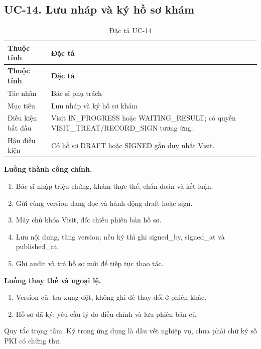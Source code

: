 \clearpage

\subsection{UC-14.\allowbreak{} Lưu nháp và ký hồ sơ khám}
\label{uc:14}

{\small\setlength{\tabcolsep}{3pt}\renewcommand{\arraystretch}{1.12}
\begin{longtable}{@{}L{\textwidth-1.32pt\relax} L{\textwidth-4.68pt\relax}@{}}
\caption{Đặc tả UC-14}\\
\toprule
\textbf{Thuộc tính} & \textbf{Đặc tả}\\\midrule
\endfirsthead
\toprule
\textbf{Thuộc tính} & \textbf{Đặc tả}\\\midrule
\endhead
\bottomrule\endlastfoot
Tác nhân & Bác sĩ phụ trách\\[3pt]
Mục tiêu & Lưu nháp và ký hồ sơ khám\\[3pt]
Điều kiện bắt đầu & Visit IN\_\allowbreak{}PROGRESS hoặc WAITING\_\allowbreak{}RESULT; có quyền VISIT\_\allowbreak{}TREAT/\allowbreak{}RECORD\_\allowbreak{}SIGN tương ứng.\allowbreak{}\\[3pt]
Hậu điều kiện & Có hồ sơ DRAFT hoặc SIGNED gắn duy nhất Visit.\allowbreak{}\\[3pt]
\end{longtable}}
\noindent\textbf{Luồng thành công chính.}
\begin{enumerate}
\item Bác sĩ nhập triệu chứng, khám thực thể, chẩn đoán và kết luận.\allowbreak{}
\item Gửi cùng version đang đọc và hành động draft hoặc sign.\allowbreak{}
\item Máy chủ khóa Visit, đối chiếu phiên bản hồ sơ.\allowbreak{}
\item Lưu nội dung, tăng version; nếu ký thì ghi signed\_\allowbreak{}by, signed\_\allowbreak{}at và published\_\allowbreak{}at.\allowbreak{}
\item Ghi audit và trả hồ sơ mới để tiếp tục thao tác.\allowbreak{}
\end{enumerate}
\noindent\textbf{Luồng thay thế và ngoại lệ.}
\begin{enumerate}
\item Version cũ:\allowbreak{} trả xung đột, không ghi đè thay đổi ở phiên khác.\allowbreak{}
\item Hồ sơ đã ký:\allowbreak{} yêu cầu lý do điều chỉnh và lưu phiên bản cũ.\allowbreak{}
\end{enumerate}
Quy tắc trọng tâm:\allowbreak{} Ký trong ứng dụng là dấu vết nghiệp vụ, chưa phải chữ ký số PKI có chứng thư.\allowbreak{}

